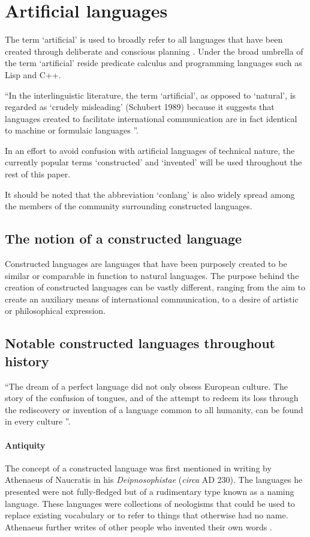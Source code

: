 \documentclass[14pt, a4paper]{extreport}
\begin{document}
  \section{Artificial languages}
The term `artificial' is used to broadly refer to all languages that have been created through deliberate and conscious planning \parencite[41]{stria}. Under the broad umbrella of the term `artificial' reside predicate calculus and programming languages such as Lisp and C++.

``In the interlinguistic literature, the term `artificial', as opposed to `natural', is regarded as `crudely misleading' (Schubert 1989) because it suggests that languages created to facilitate international communication are in fact identical to machine or formulaic languages \parencite[45]{stria}''.

In an effort to avoid confusion with artificial languages of technical nature, the currently popular terms `constructed' and `invented' will be used throughout the rest of this paper.

It should be noted that the abbreviation `conlang' is also widely spread among the members of the community surrounding constructed languages.
\subsection{The notion of a constructed language}
Constructed languages are languages that have been purposely created to be similar or comparable in function to natural languages. The purpose behind the creation of constructed languages can be vastly different, ranging from the aim to create an auxiliary means of international communication, to a desire of artistic or philosophical expression.
    \subsection{Notable constructed languages throughout history}
``The dream of a perfect language did not only obsess European culture. The story of the confusion of tongues, and of the attempt to redeem its loss through the rediscovery or invention of a language common to all humanity, can be found in every culture \parencite[1]{eco}''.
        \paragraph{Antiquity}
The concept of a constructed language was first mentioned in writing by Athenaeus of Naucratis in his \textit{Deipnosophistae} (\textit{circa} \textsc{AD} 230). The languages he presented were not fully-fledged but of a rudimentary type known as a naming language. These languages were collections of neologisms that could be used to replace existing vocabulary or to refer to things that otherwise had no name. Athenaeus further writes of other people who invented their own words \parencite{sanders}.
\end{document}
